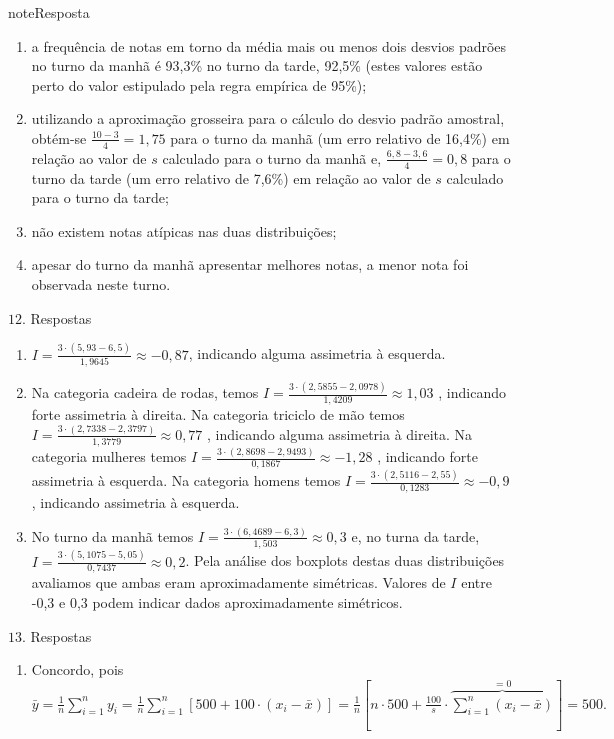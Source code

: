 \begin{sphinxadmonition}{note}{Resposta}
\begin{enumerate}
\item {} 
a frequência de notas em torno da média mais ou menos dois desvios padrões no turno da manhã é 93,3\% no turno da tarde, 92,5\% (estes valores estão perto do valor estipulado pela regra empírica de 95\%);

\item {} 
utilizando a aproximação grosseira para o cálculo do desvio padrão amostral, obtém-se \(\frac{10-3}{4}=1,75\) para o turno da manhã (um erro relativo de 16,4\%) em relação ao valor de \(s\) calculado para o turno da manhã e, \(\frac{6,8-3,6}{4}=0,8\) para o turno da tarde (um erro relativo de 7,6\%) em relação ao valor de \(s\) calculado para o turno da tarde;

\item {} 
não existem notas atípicas nas duas distribuições;

\item {} 
apesar do turno da manhã apresentar melhores notas, a menor nota foi observada neste turno.

\end{enumerate}

\(12.\) Respostas
\begin{enumerate}
\item {} 
\(I=\frac{3\cdot (5,93-6,5)}{1,9645}\approx -0,87\), indicando alguma assimetria à esquerda.

\item {} 
Na categoria cadeira de rodas, temos \(I=\frac{3\cdot (2,5855-2,0978)}{1,4209}\approx 1,03\) , indicando forte assimetria à direita. Na categoria triciclo de mão temos \(I=\frac{3\cdot (2,7338-2,3797)}{1,3779}\approx 0,77\) , indicando alguma assimetria à direita. Na categoria mulheres temos \(I=\frac{3\cdot (2,8698-2,9493)}{0,1867}\approx -1,28\) , indicando forte assimetria à esquerda.  Na categoria homens temos \(I=\frac{3\cdot (2,5116-2,55)}{0,1283}\approx -0,9\) , indicando assimetria à esquerda.

\item {} 
No turno da manhã temos \(I=\frac{3\cdot (6,4689-6,3)}{1,503}\approx 0,3\) e, no turna da tarde,   \(I=\frac{3\cdot (5,1075-5,05)}{0,7437}\approx 0,2\). Pela análise dos boxplots destas duas distribuições avaliamos que ambas eram aproximadamente simétricas. Valores de \(I\) entre -0,3 e 0,3 podem indicar dados aproximadamente simétricos.

\end{enumerate}

\(13.\) Respostas
\begin{enumerate}
\item {} 
Concordo, pois \(\bar{y}=\frac{1}{n}\displaystyle{\sum^n_{i=1}}y_i=\frac{1}{n}\displaystyle{\sum^n_{i=1}}[500+100\cdot (x_i-\bar{x})]=\frac{1}{n}[n\cdot 500+\frac{100}{s}\cdot \overbrace{\displaystyle{\sum^n_{i=1}}(x_i-\bar{x})}^{=0}]=500.\)


\end{enumerate}
\end{sphinxadmonition}
